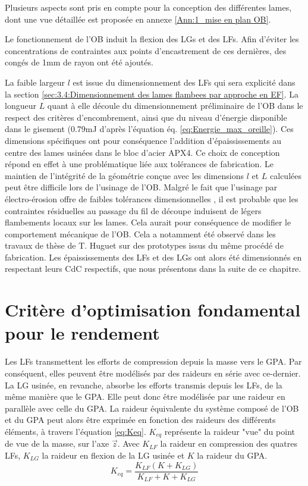 Plusieurs aspects sont pris en compte pour la conception des différentes lames, dont une vue détaillée est proposée en annexe \ref{Ann:1_mise en plan OB}.

Le fonctionnement de l'OB induit la flexion des LGs et des LFs. Afin d'éviter les concentrations de contraintes aux points d'encastrement de ces dernières, des congés de 1mm de rayon ont été ajoutés. 

La faible largeur $l$ est issue du dimensionnement des LFs qui sera explicité dans la section \ref{sec:3.4:Dimensionnement des lames flambees par approche en EF}. La longueur $L$ quant à elle découle du dimensionnement préliminaire de l'OB dans le respect des critères d'encombrement, ainsi que du niveau d'énergie disponible dans le gisement (0.79mJ d'après l'équation éq. \ref{eq:Energie_max_oreille}). Ces dimensions spécifiques ont pour conséquence l'addition d'épaississements au centre des lames usinées dans le bloc d'acier APX4. Ce choix de conception répond en effet à une problématique liée aux tolérances de fabrication. Le maintien de l'intégrité de la géométrie conçue avec les dimensions $l$ et $L$ calculées peut être difficile lors de l'usinage de l'OB. Malgré le fait que l'usinage par électro-érosion offre de faibles tolérances dimensionnelles \cite{Rajurkar1997}, il est probable que les contraintes résiduelles au passage du fil de découpe induisent de légers flambements locaux sur les lames. Cela aurait pour conséquence de modifier le comportement mécanique de l'OB. Cela a notamment été observé dans les travaux de thèse de T. Huguet \cite{Huguet2019} sur des prototypes issus du même procédé de fabrication. Les épaississements des LFs et des LGs ont alors été dimensionnés en respectant leurs CdC respectifs, que nous présentons dans la suite de ce chapitre.

\section{Critère d'optimisation fondamental pour le rendement}
\label{sec:3.3:Critere d optimisation fondamental pour le rendement}
Les LFs transmettent les efforts de compression depuis la masse vers le GPA. Par conséquent, elles peuvent être modélisés par des raideurs en série avec ce-dernier. La LG usinée, en revanche, absorbe les efforts transmis depuis les LFs, de la même manière que le GPA. Elle peut donc être modélisée par une raideur en parallèle avec celle du GPA. La raideur équivalente du système composé de l'OB et du GPA peut alors être exprimée en fonction des raideurs des différents éléments, à travers l'équation \ref{eq:Keq}. $K_{eq}$ représente la raideur "vue" du point de vue de la masse, sur l'axe $\vec{z}$. Avec $K_{LF}$ la raideur en compression des quatres LFs, $K_{LG}$ la raideur en flexion de la LG usinée et $K$ la raideur du GPA. 
\begin{equation}
	K_{eq} = \dfrac{K_{LF}(K + K_{LG})}{K_{LF}+ K + K_{LG}}
	\label{eq:Keq}
\end{equation}


